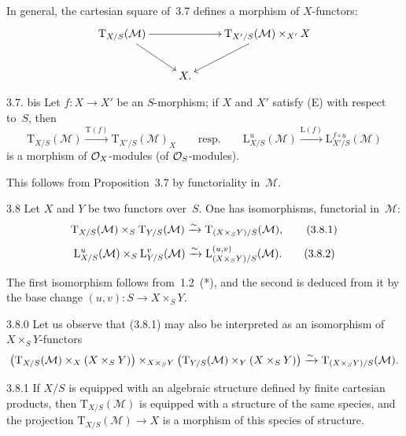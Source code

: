 In general, the cartesian square of~3.7 defines a morphism of \(X\)-functors:
\[
\xymatrix{
\mathrm{T}_{X/S}(\mathcal{M})\ar[rr]\ar[rd]
& & \mathrm{T}_{X'/S}(\mathcal{M})\times_{X'}X\ar[ld]\\
& X. &
}
\]

\begin{proposition}{3.7. bis}\label{II.3.7.bis}
Let \(f\colon X\to X'\) be an \(S\)-morphism; if \(X\) and \(X'\) satisfy
\textup{(E)} with respect to~\(S\), then
\[
\mathrm{T}_{X/S}(\mathcal{M})\xrightarrow{\mathrm{T}(f)}
\mathrm{T}_{X'/S}(\mathcal{M})_{X}
\qquad\text{resp.}\qquad
\mathrm{L}^{u}_{X/S}(\mathcal{M})\xrightarrow{\mathrm{L}(f)}
\mathrm{L}^{f\circ u}_{X'/S}(\mathcal{M})
\]
is a morphism of \(\mathcal{O}_X\)-modules (\resp of \(\mathcal{O}_S\)-modules).
\end{proposition}

This follows from Proposition~3.7 by functoriality in~\(\mathcal{M}\).

\begin{proposition}{3.8}\label{II.3.8}
Let \(X\) and \(Y\) be two functors over~\(S\). One has isomorphisms, functorial
in~\(\mathcal{M}\):
\begin{equation}
\mathrm{T}_{X/S}(\mathcal{M})\times_{S}\mathrm{T}_{Y/S}(\mathcal{M})
\xrightarrow{\sim}
\mathrm{T}_{(X\times_{S}Y)/S}(\mathcal{M}),
\tag{3.8.1}
\end{equation}
\begin{equation}
\mathrm{L}^{u}_{X/S}(\mathcal{M})\times_{S}\mathrm{L}^{v}_{Y/S}(\mathcal{M})
\xrightarrow{\sim}
\mathrm{L}^{(u,v)}_{(X\times_{S}Y)/S}(\mathcal{M}).
\tag{3.8.2}
\end{equation}
\end{proposition}

{\renewcommand{\thefootnote}{(28)}}
The first isomorphism follows from~1.2~(*), and the second is deduced from it
by the base change \((u,v)\colon S\to X\times_{S}Y\).

\begin{remark}{3.8.0}\label{II.3.8.0}
Let us observe that \textup{(3.8.1)} may also be interpreted as an isomorphism
of \(X\times_{S}Y\)-functors
\[
\bigl(\mathrm{T}_{X/S}(\mathcal{M})\times_{X}(X\times_{S}Y)\bigr)
\times_{X\times_{S}Y}
\bigl(\mathrm{T}_{Y/S}(\mathcal{M})\times_{Y}(X\times_{S}Y)\bigr)
\xrightarrow{\sim}
\mathrm{T}_{(X\times_{S}Y)/S}(\mathcal{M}).
\]
\end{remark}

\begin{corollary}{3.8.1}\label{II.3.8.1}
If \(X/S\) is equipped with an algebraic structure defined by finite cartesian
products, then \(\mathrm{T}_{X/S}(\mathcal{M})\) is equipped with a structure of
the same species, and the projection
\(\mathrm{T}_{X/S}(\mathcal{M})\to X\) is a morphism of this species of
structure.
\end{corollary}

